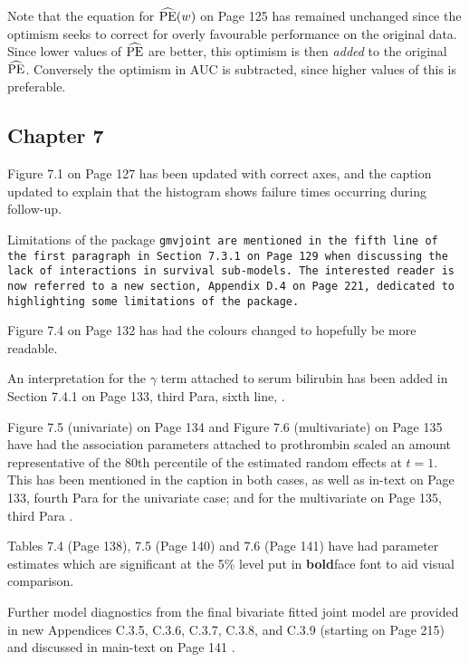 \documentclass{article}
\begin{document}
Note that the equation for $\widehat{\mathrm{PE}}\!\left( w\right)$ on Page 125 has remained unchanged since the optimism seeks to correct for overly favourable performance on the original data. Since lower values of $\widehat{\mathrm{PE}}$ are better, this optimism is then \textit{added} to the original $\widehat{\mathrm{PE}}$. Conversely the optimism in AUC is subtracted, since higher values of this is preferable.

\subsection*{Chapter 7}
Figure 7.1 on Page 127 has been updated with correct axes, and the caption updated to explain that the histogram shows failure times occurring during follow-up.

Limitations of the package \tt{gmvjoint} are mentioned in the fifth line of the first paragraph in Section 7.3.1 on Page 129 when discussing the lack of interactions in survival sub-models. The interested reader is now referred to a new section, Appendix D.4 on Page 221, dedicated to highlighting some limitations of the package.

Figure 7.4 on Page 132 has had the colours changed to hopefully be more readable.

An interpretation for the $\gamma$ term attached to serum bilirubin has been added in Section 7.4.1 on Page 133, third Para, sixth line,  .

Figure 7.5 (univariate) on Page 134 and Figure 7.6 (multivariate) on Page 135 have had the association parameters attached to prothrombin scaled an amount representative of the 80th percentile of the estimated random effects at $t=1$. This has been mentioned in the caption in both cases, as well as in-text on Page 133, fourth Para  for the univariate case; and for the multivariate on Page 135, third Para .

Tables 7.4 (Page 138), 7.5 (Page 140) and 7.6 (Page 141) have had parameter estimates which are significant at the 5\% level put in \textbf{bold}face font to aid visual comparison.

Further model diagnostics from the final bivariate fitted joint model are provided in new Appendices C.3.5, C.3.6, C.3.7, C.3.8, and C.3.9  (starting on Page 215) and discussed in main-text on Page 141 . 
\end{document}
